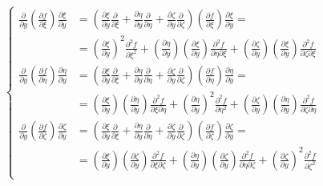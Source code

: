 \documentclass
[
a4paper,                      %
twoside,					  %
12pt,                         %
abstract,		      %
fleqn,                        %
]
{scrartcl} %
\begin{document}
\begin{description}
\begin{equation}
\begin{cases}
\frac{\partial}{\partial y}\left(\frac{\partial f}{\partial\xi}\right)\frac{\partial\xi}{\partial y}&=\left(\frac{\partial\xi}{\partial y}\frac{\partial}{\partial\xi}+\frac{\partial\eta}{\partial y}\frac{\partial}{\partial\eta}+\frac{\partial\zeta}{\partial y}\frac{\partial}{\partial\zeta}\right)\left(\frac{\partial f}{\partial\xi}\right)\frac{\partial\xi}{\partial y}=\\[5pt]
&=\left(\frac{\partial\xi}{\partial y}\right)^{2}\frac{\partial^{2} f}{\partial\xi^{2}}+\left(\frac{\partial\eta}{\partial y}\right)\left(\frac{\partial\xi}{\partial y}\right)\frac{\partial^{2} f}{\partial\eta\partial\xi}+\left(\frac{\partial\zeta}{\partial y}\right)\left(\frac{\partial\xi}{\partial y}\right)\frac{\partial^{2} f}{\partial\zeta\partial\xi}\\[10pt]
\frac{\partial}{\partial y}\left(\frac{\partial f}{\partial\eta}\right)\frac{\partial\eta}{\partial y}&=\left(\frac{\partial\xi}{\partial y}\frac{\partial}{\partial\xi}+\frac{\partial\eta}{\partial y}\frac{\partial}{\partial\eta}+\frac{\partial\zeta}{\partial y}\frac{\partial}{\partial\zeta}\right)\left(\frac{\partial f}{\partial\eta}\right)\frac{\partial\eta}{\partial y}=\\[5pt]
&=\left(\frac{\partial\xi}{\partial y}\right)\left(\frac{\partial\eta}{\partial y}\right)\frac{\partial^{2} f}{\partial\xi\partial\eta}+\left(\frac{\partial\eta}{\partial y}\right)^{2}\frac{\partial^{2} f}{\partial\eta^{2}}+\left(\frac{\partial\zeta}{\partial y}\right)\left(\frac{\partial\eta}{\partial y}\right)\frac{\partial^{2} f}{\partial\zeta\partial\eta}\\[10pt]
\frac{\partial}{\partial y}\left(\frac{\partial f}{\partial\zeta}\right)\frac{\partial\zeta}{\partial y}&=\left(\frac{\partial\xi}{\partial y}\frac{\partial}{\partial\xi}+\frac{\partial\eta}{\partial y}\frac{\partial}{\partial\eta}+\frac{\partial\zeta}{\partial y}\frac{\partial}{\partial\zeta}\right)\left(\frac{\partial f}{\partial\zeta}\right)\frac{\partial\zeta}{\partial y}=\\[5pt]
&=\left(\frac{\partial\xi}{\partial y}\right)\left(\frac{\partial\zeta}{\partial y}\right)\frac{\partial^{2} f}{\partial\xi\partial\zeta}+\left(\frac{\partial\eta}{\partial y}\right)\left(\frac{\partial\zeta}{\partial y}\right)\frac{\partial^{2} f}{\partial\eta\partial\zeta}+\left(\frac{\partial\zeta}{\partial y}\right)^{2}\frac{\partial^{2} f}{\partial\zeta^{2}}\\[5pt]
\end{cases}
\end{equation}


\end{description}
\end{document}
